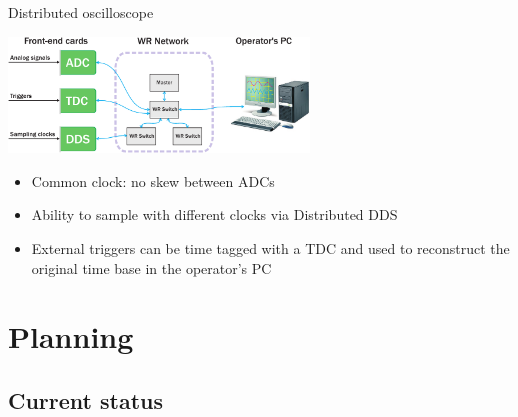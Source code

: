 \documentclass[compress,red]{beamer}
\begin{document}


\begin{frame}{Distributed oscilloscope}
  \begin{center}
    \includegraphics[width=8cm]{applications/distr_oscill}
    \end{center}
    \begin{block}{}
      \begin{itemize}
      \item Common clock: no skew between ADCs
      \item Ability to sample with different clocks via Distributed DDS
      \item External triggers can be time tagged with a TDC and used to reconstruct the original time base in the operator's PC
      \end{itemize}
    \end{block}
\end{frame}



\section{Planning}

\subsection{Current status}
\end{document}

